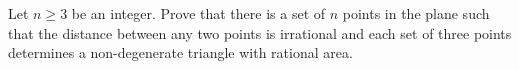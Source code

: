 Let $n\ge3$ be an integer. Prove that there is a set of $n$
 points in the plane such that the distance between any two points is 
irrational and each set of three points determines a non-degenerate 
triangle with rational area.
